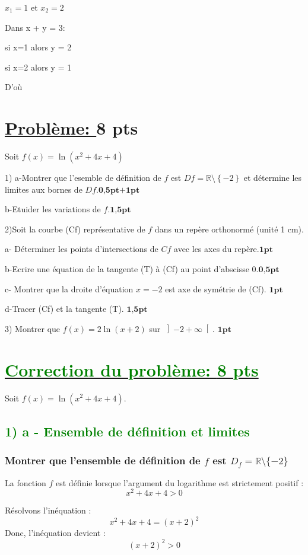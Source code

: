 \documentclass[12pt]{article}
\begin{document}
$x_{1}=1$ et $x_{2}=2$

Dans x + y = 3:

si x=1 alors y = 2 

si x=2 alors y = 1 

D'où \textcolor{green}{}
\section*{\underline{Problème: }\textbf{8 pts}}
Soit $f(x)=\ln(x^{2}+4x+4)$

1) a-Montrer que l'esemble de définition de $f$ est $Df=\mathbb{R}\setminus\left\lbrace -2 \right\rbrace $ et détermine les limites aux bornes de $Df$.$\textbf{0,5pt+1pt}$

b-Etuider les variations de $f$.$\textbf{1,5pt}$

2)Soit la courbe (Cf) représentative de $f$ dans un repère orthonormé (unité 1 cm).

a- Déterminer les points d'intersections de $Cf$ avec les axes du repère.$\textbf{1pt}$

b-Ecrire une équation de la tangente (T) à (Cf) au point d'abscisse 0.$\textbf{0,5pt}$

c- Montrer que la droite d'équation $x=-2$ est axe de  symétrie de (Cf). $\textbf{1pt}$

d-Tracer (Cf) et la tangente (T). $\textbf{1,5pt}$

3) Montrer que $f(x)=2\ln(x+2)$ sur $ \left]-2 +\infty \right[ $. $\textbf{1pt}$

\section*{\underline{\textcolor{green}{Correction du problème: \textbf{8 pts}}}}
Soit \( f(x) = \ln(x^2 + 4x + 4) \).

\subsection*{\textcolor{green}{1) a - Ensemble de définition et limites}}
\subsubsection*{Montrer que l'ensemble de définition de \( f \) est \( D_f = \mathbb{R} \setminus \{-2\} \)}
La fonction \( f \) est définie lorsque l'argument du logarithme est strictement positif :
\[
x^2 + 4x + 4 > 0
\]

Résolvons l'inéquation :
\[
x^2 + 4x + 4 = (x + 2)^2
\]
Donc, l'inéquation devient :
\[
(x + 2)^2 > 0
\]
\end{document}
